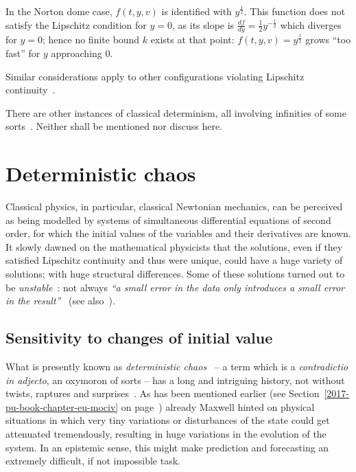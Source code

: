 In the Norton dome case, $ f(t,y,v) $ is identified with $y^\frac{1}{2}$.
This function does not satisfy the Lipschitz condition for $y=0$,
as its slope  is $\frac{d f}{d y} = \frac{1}{2} y^{-\frac{1}{2}}$
which diverges for $y=0$; hence no finite bound $k$ exists at that point:
$f(t,y,v) = y^\frac{1}{2}$ grows ``too fast'' for $y$ approaching $0$.

Similar considerations apply to other
configurations  violating Lipschitz continuity~\cite{Fletcher2012,vanStrien2014}.

There are other instances of classical determinism, all involving
infinities of some sorts~\cite[Chapter on Indeterministic Physical Systems]{Norton-induction}.
Neither shall be mentioned nor discuss here.


\chapter{Deterministic chaos}
\label{2016-pu-book-chapter-chaos} %

Classical physics, in particular, classical Newtonian mechanics,
can be perceived
as being modelled by systems of simultaneous differential equations of second order, for which the initial values of the variables and their derivatives are known.
It slowly dawned on the mathematical physicists that the solutions, even if they satisfied Lipschitz continuity and thus were unique,
could have a huge variety of solutions; with huge structural differences.
Some of these solutions turned out to be {\em unstable}~\cite{hahn-67}:
not always {\em ``a small error in the data only
introduces a small error in the result''}~\cite[pp.~442]{Campbell-1882}
(see also~\cite{Deakin1988}).



\section{Sensitivity to changes of initial value}

What is presently known as
{\em deterministic chaos}~\cite{schuster1,Peitgen-J-S}
-- a term which is a {\it contradictio in adjecto}, an oxymoron of sorts --
has a long and intriguing history,
not without twists, raptures and surprises~\cite{Diacu96,Diacu96-ce}.
As has been mentioned earlier
(see Section~\ref{2017-pu-book-chapter-eu-mociv} on page~\pageref{2017-pu-book-chapter-eu-mociv})
already Maxwell hinted on physical situations in which very tiny variations or disturbances of the state
could get attenuated tremendously, resulting in huge variations in the evolution of the system.
In an epistemic sense, this might make prediction and forecasting an extremely difficult, if not impossible task.


